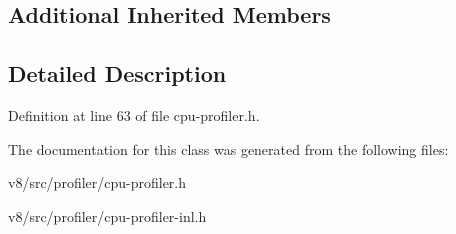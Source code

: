 \subsection*{Additional Inherited Members}


\subsection{Detailed Description}


Definition at line 63 of file cpu-\/profiler.\+h.



The documentation for this class was generated from the following files\+:\begin{DoxyCompactItemize}
\item 
v8/src/profiler/cpu-\/profiler.\+h\item 
v8/src/profiler/cpu-\/profiler-\/inl.\+h\end{DoxyCompactItemize}

